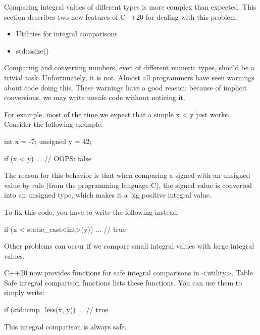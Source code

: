 
Comparing integral values of different types is more complex than expected. This section describes two new features of C++20 for dealing with this problem:

\begin{itemize}
\item 
Utilities for integral comparisons

\item 
std::ssize()
\end{itemize}


Comparing and converting numbers, even of different numeric types, should be a trivial task. Unfortunately, it is not. Almost all programmers have seen warnings about code doing this. These warnings have a good reason: because of implicit conversions, we may write unsafe code without noticing it.

For example, most of the time we expect that a simple x < y just works. Consider the following example:

\begin{cpp}
int x = -7;
unsigned y = 42;

if (x < y) ... // OOPS: false
\end{cpp}

The reason for this behavior is that when comparing a signed with an unsigned value by rule (from the programming language C), the signed value is converted into an unsigned type, which makes it a big positive integral value.

To fix this code, you have to write the following instead:

\begin{cpp}
if (x < static_cast<int>(y)) ... // true
\end{cpp}

Other problems can occur if we compare small integral values with large integral values.

C++20 now provides functions for safe integral comparisons in <utility>. Table Safe integral comparison functions lists these functions. You can use them to simply write:

\begin{cpp}
if (std::cmp_less(x, y)) ... // true
\end{cpp}

This integral comparison is always safe.

